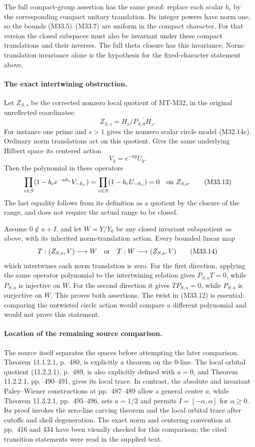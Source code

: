 The full compact-group assertion has the same proof:
replace each scalar $b_v$ by the corresponding compact
unitary translation.  Its integer powers have norm one,
so the bounds (M33.5)--(M33.7) are uniform in the compact
character.  For that version the closed subspaces must
also be invariant under these compact translations and
their inverses.  The full theta closure has this
invariance.  Norm-translation invariance alone is the
hypothesis for the fixed-character statement above.

\paragraph{The exact intertwining obstruction.}
Let $Z_{S,s}$ be the corrected nonzero local quotient of
MT-M32, in the original unreflected coordinates:
\[
       Z_{S,s}=H_s/\overline{P_{S,0}H_s}.
 \tag{M33.11}
\]
For instance one prime and $s>1$ gives the nonzero
scalar circle model (M32.14c).
Ordinary norm translations act on this quotient.
Give the same underlying Hilbert space its centered
action
\[
                   V_y=e^{-ay}U_y.
 \tag{M33.12}
\]
Then the polynomial in these operators
\[
       \prod_{v\in S}(1-b_ve^{-ah_v}V_{-h_v})
       =\prod_{v\in S}(1-b_vU_{-h_v})
       =0\quad\hbox{on }Z_{S,s}.
 \tag{M33.13}
\]
The last equality follows from its definition as a
quotient by the closure of the range, and does not
require the actual range to be closed.

Assume $0\notin a+I$, and let $W=Y/Y_0$ be any
closed invariant subquotient as above, with its
inherited norm-translation action.  Every bounded
linear map
\[
       T:(Z_{S,s},V)\longrightarrow W
       \quad\hbox{or}\quad
       T:W\longrightarrow(Z_{S,s},V)
 \tag{M33.14}
\]
which intertwines each norm translation is zero.
For the first direction, applying the same operator
polynomial to the intertwining relation gives
$P_{S,a}T=0$, while $P_{S,a}$ is injective on $W$.
For the second direction it gives $TP_{S,a}=0$,
while $P_{S,a}$ is surjective on $W$.
This proves both assertions.  The twist in (M33.12)
is essential: comparing the untwisted circle action
would compare a different polynomial and would not
prove this statement.

\paragraph{Location of the remaining source comparison.}
The source itself separates the spaces before attempting
the later comparison.  Theorem 11.1.2.1, p.~480,
is explicitly a theorem on the $0$-line.  The local
orbital quotient (11.2.2.1), p.~489, is also explicitly
defined with $a=0$, and Theorem 11.2.2.1,
pp.~490--491, gives its local trace.
In contrast, the absolute and invariant Paley--Wiener
constructions at pp.~487--489 allow a general center
$a$, while Theorem 11.3.2.1, pp.~495--496, sets
$a=1/2$ and permits $I=[-\alpha,\alpha]$ for
$\alpha\geq0$.  Its proof invokes the zero-line
carving theorem and the local orbital trace after
cutoffs and shell degeneration.  The exact norm and
centering convention at pp.~416 and 434 have been
visually checked for this comparison; the cited
transition statements were read in the supplied text.

